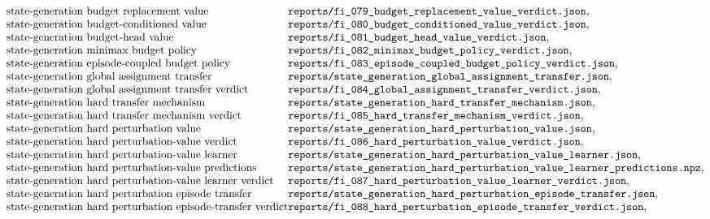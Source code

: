 $$\begin{array}{@{}l@{}l@{}}
\text{state-generation budget replacement value} & \texttt{reports/fi\_079\_budget\_replacement\_value\_verdict.json},\\
\text{state-generation budget-conditioned value} & \texttt{reports/fi\_080\_budget\_conditioned\_value\_verdict.json},\\
\text{state-generation budget-head value} & \texttt{reports/fi\_081\_budget\_head\_value\_verdict.json},\\
\text{state-generation minimax budget policy} & \texttt{reports/fi\_082\_minimax\_budget\_policy\_verdict.json},\\
\text{state-generation episode-coupled budget policy} & \texttt{reports/fi\_083\_episode\_coupled\_budget\_policy\_verdict.json},\\
\text{state-generation global assignment transfer} & \texttt{reports/state\_generation\_global\_assignment\_transfer.json},\\
\text{state-generation global assignment transfer verdict} & \texttt{reports/fi\_084\_global\_assignment\_transfer\_verdict.json},\\
\text{state-generation hard transfer mechanism} & \texttt{reports/state\_generation\_hard\_transfer\_mechanism.json},\\
\text{state-generation hard transfer mechanism verdict} & \texttt{reports/fi\_085\_hard\_transfer\_mechanism\_verdict.json},\\
\text{state-generation hard perturbation value} & \texttt{reports/state\_generation\_hard\_perturbation\_value.json},\\
\text{state-generation hard perturbation-value verdict} & \texttt{reports/fi\_086\_hard\_perturbation\_value\_verdict.json},\\
\text{state-generation hard perturbation-value learner} & \texttt{reports/state\_generation\_hard\_perturbation\_value\_learner.json},\\
\text{state-generation hard perturbation-value predictions} & \texttt{reports/state\_generation\_hard\_perturbation\_value\_learner\_predictions.npz},\\
\text{state-generation hard perturbation-value learner verdict} & \texttt{reports/fi\_087\_hard\_perturbation\_value\_learner\_verdict.json},\\
\text{state-generation hard perturbation episode transfer} & \texttt{reports/state\_generation\_hard\_perturbation\_episode\_transfer.json},\\
\text{state-generation hard perturbation episode-transfer verdict} & \texttt{reports/fi\_088\_hard\_perturbation\_episode\_transfer\_verdict.json},\\

\end{array}$$
